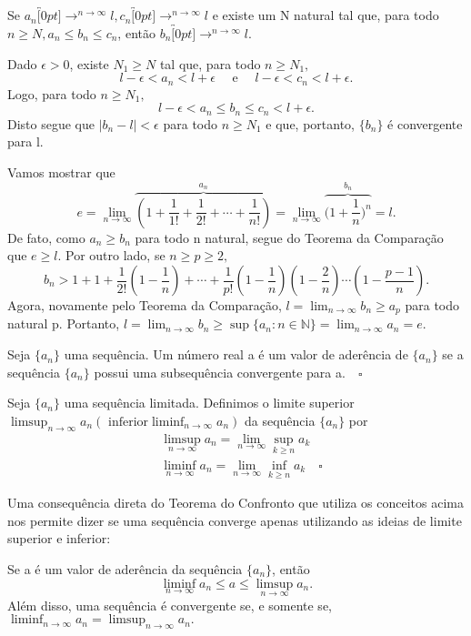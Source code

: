 \documentclass[Analysis/analysis_notes.tex]{subfiles}
\begin{document}
\begin{theorem*}
	Se $a_{n}\overbracket[0pt]{\longrightarrow}^{n\to \infty}l, c_{n}\overbracket[0pt]{\longrightarrow}^{n\to \infty}l$ e existe um
	N natural tal que, para todo $n\geq{N}, a_{n}\leq{b_{n}}\leq{c_{n}}$, ent\~ao $b_{n}\overbracket[0pt]{\longrightarrow}^{n\to \infty}l.$
\end{theorem*}
\begin{proof*}
	Dado $\epsilon>0$, existe $N_{1}\geq{N}$ tal que, para todo $n\geq{N_{1}},$
	$$
		l - \epsilon < a_{n} < l + \epsilon\quad\text{ e }\quad l-\epsilon < c_{n} < l+\epsilon.
	$$
	Logo, para todo $n\geq{N_{1}},$
	$$
		l - \epsilon < a_{n}\leq{b_{n}}\leq{c_{n}}<l + \epsilon.
	$$
	Disto segue que $|b_{n} - l|< \epsilon$ para todo $n\geq{N_{1}}$ e que, portanto, $\{b_{n}\} $ \'e convergente para l. \qedsymbol
\end{proof*}
\begin{example}
	Vamos mostrar que
	$$
		e = \lim_{n\to\infty}\overbrace{(1 + \frac{1}{1!} + \frac{1}{2!} + \cdots + \frac{1}{n!})}^{a_{n}} = \lim_{n\to\infty}\overbrace{\biggl(1 + \frac{1}{n}\biggr)^{n}}^{b_{n}} = l.
	$$
	De fato, como $a_{n} \geq{b_{n}}$ para todo n natural, segue do Teorema da Compara\c c\~ao que $e\geq{l}.$ Por outro lado, se
	$n\geq{p}\geq{2},$
	$$
		b_{n} > 1 + 1 + \frac{1}{2!}(1-\frac{1}{n})+\cdots+\frac{1}{p!}(1-\frac{1}{n})(1-\frac{2}{n})\cdots(1-\frac{p-1}{n}).
	$$
	Agora, novamente pelo Teorema da Compara\c c\~ao, $l = \displaystyle \lim_{n\to\infty}b_{n}\geq{a_{p}}$ para todo natural p.
	Portanto, $l = \displaystyle \lim_{n\to\infty}b_{n}\geq{\sup\{a_{n}:n\in \mathbb{N}\}} = \lim_{n\to\infty}a_{n} = e.$ \qedsymbol
\end{example}
\begin{def*}
	Seja $\{a_{n}\} $ uma sequ\^encia. Um n\'umero real a \'e um valor de ader\^encia de $\{a_{n}\} $ se a sequ\^encia $\{a_{n}\}$ possui
	uma subsequ\^encia convergente para a.$\quad\square$
\end{def*}
\begin{def*}
	Seja $\{a_{n}\} $  uma sequ\^encia limitada. Definimos o limite superior $\displaystyle\limsup_{n\to\infty}a_{n}(\text{ inferior}\liminf_{n\to\infty}a_{n})$ da
	sequ\^encia $\{a_{n}\} $ por
	\begin{align*}
		 & \limsup_{n\to\infty}a_{n} = \lim_{n\to\infty}\sup_{k\geq{n}}a_{k}             \\
		 & \liminf_{n\to\infty}a_{n} = \lim_{n\to\infty}\inf_{k\geq{n}}a_{k}\quad\square
	\end{align*}
\end{def*}
Uma consequ\^encia direta do Teorema do Confronto que utiliza os conceitos acima nos permite dizer se uma sequ\^encia converge apenas
utilizando as ideias de limite superior e inferior:
\begin{theorem*}
	Se a \'e um valor de ader\^encia da sequ\^encia $\{a_{n}\} $, ent\~ao
	$$
		\liminf_{n\to\infty}a_{n}\leq{a}\leq{\limsup_{n\to\infty}a_{n}}.
	$$
	Al\'em disso, uma sequ\^encia \'e convergente se, e somente se, $\liminf_{n\to\infty}a_{n} = \limsup_{n\to\infty}a_{n}.$
\end{theorem*}
\end{document}
